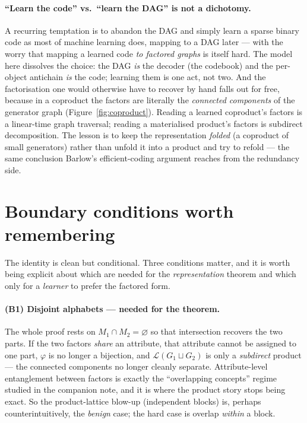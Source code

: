 \documentclass[11pt]{article}
\theoremstyle{definition}
\theoremstyle{plain}
\theoremstyle{remark}
\newcommand{\Lgen}{\mathcal{L}}            %
\newcommand{\Gcoprod}{\sqcup}             %
\newcommand{\attrs}{M}
\begin{document}
\paragraph{``Learn the code'' vs.\ ``learn the DAG'' is not a dichotomy.}
A recurring temptation is to abandon the DAG and simply learn a sparse binary
code as most of machine learning does, mapping to a DAG later --- with the worry
that mapping a learned code \emph{to factored graphs} is itself hard. The model
here dissolves the choice: the DAG \emph{is} the decoder (the codebook) and the
per-object antichain \emph{is} the code; learning them is one act, not two. And
the factorisation one would otherwise have to recover by hand falls out for free,
because in a coproduct the factors are literally the \emph{connected components}
of the generator graph (Figure~\ref{fig:coproduct}). Reading a learned coproduct's
factors is a linear-time graph traversal; reading a materialised product's factors
is subdirect decomposition. The lesson is to keep the representation \emph{folded}
(a coproduct of small generators) rather than unfold it into a product and try to
refold --- the same conclusion Barlow's efficient-coding argument reaches from the
redundancy side.

\section{Boundary conditions worth remembering}
\label{sec:boundary}

The identity is clean but conditional. Three conditions matter, and it is worth
being explicit about which are needed for the \emph{representation} theorem and
which only for a \emph{learner} to prefer the factored form.

\paragraph{(B1) Disjoint alphabets --- needed for the theorem.} The whole proof
rests on $\attrs_1\cap\attrs_2=\varnothing$ so that intersection recovers the two
parts. If the two factors \emph{share} an attribute, that attribute cannot be
assigned to one part, $\varphi$ is no longer a bijection, and $\Lgen(G_1\Gcoprod
G_2)$ is only a \emph{subdirect} product --- the connected components no longer
cleanly separate. Attribute-level entanglement between factors is exactly the
``overlapping concepts'' regime studied in the companion note, and it is where the
product story stops being exact. So the product-lattice blow-up (independent
blocks) is, perhaps counterintuitively, the \emph{benign} case; the hard case is
overlap \emph{within} a block.
\end{document}
